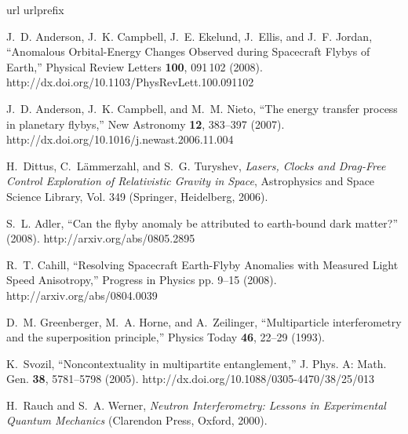 \documentclass[prl,preprint,amsfonts,showpacs,showkeys]{revtex4}
\begin{document}
%
%
%
%
%


\begin{thebibliography}{1}
\newcommand{\enquote}[1]{``#1''}
\expandafter\ifx\csname url\endcsname\relax
  \def\url#1{{#1}}\fi
\expandafter\ifx\csname urlprefix\endcsname\relax\def\urlprefix{}\fi

J.~D. Anderson, J.~K. Campbell, J.~E. Ekelund, J.~Ellis, and J.~F. Jordan,
  \enquote{Anomalous Orbital-Energy Changes Observed during Spacecraft Flybys
  of Earth,} Physical Review Letters {\bf 100}, 091\,102 (2008).
\newline http://dx.doi.org/10.1103/PhysRevLett.100.091102

J.~D. Anderson, J.~K. Campbell, and M.~M. Nieto, \enquote{The energy transfer
  process in planetary flybys,} New Astronomy {\bf 12}, 383--397 (2007).
\newline http://dx.doi.org/10.1016/j.newast.2006.11.004

H.~Dittus, C.~L{\"{a}}mmerzahl, and S.~G. Turyshev, {\em Lasers, Clocks and
  Drag-Free Control Exploration of Relativistic Gravity in Space\/},
  Astrophysics and Space Science Library, Vol. 349 (Springer, Heidelberg,
  2006).

S.~L. Adler, \enquote{Can the flyby anomaly be attributed to earth-bound dark
  matter?}  (2008).
\newline http://arxiv.org/abs/0805.2895

R.~T. Cahill, \enquote{Resolving Spacecraft Earth-Flyby Anomalies with Measured
  Light Speed Anisotropy,} Progress in Physics pp. 9--15 (2008).
\newline http://arxiv.org/abs/0804.0039

D.~M. Greenberger, M.~A. Horne, and A.~Zeilinger, \enquote{Multiparticle
  interferometry and the superposition principle,} Physics Today {\bf 46},
  22--29 (1993).

K.~Svozil, \enquote{Noncontextuality in multipartite entanglement,} J. Phys. A:
  Math. Gen. {\bf 38}, 5781--5798 (2005).
\newline http://dx.doi.org/10.1088/0305-4470/38/25/013

H.~Rauch and S.~A. Werner, {\em Neutron Interferometry: Lessons in Experimental
  Quantum Mechanics\/} (Clarendon Press, Oxford, 2000).

\end{thebibliography}
\end{document}
